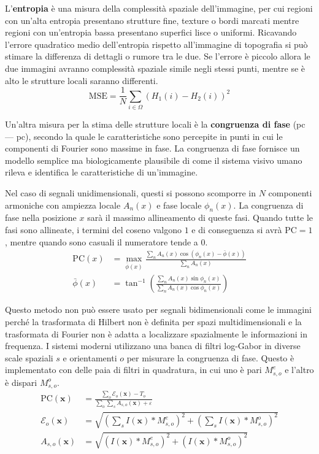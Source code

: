 \documentclass[../main.tex]{subfiles}
\begin{document}
L'\textbf{entropia} è una misura della complessità spaziale dell'immagine, per cui regioni con un'alta entropia presentano strutture fine, texture o bordi marcati mentre regioni con un'entropia bassa presentano superfici lisce o uniformi. Ricavando l'errore quadratico medio dell'entropia rispetto all'immagine di topografia si può stimare la differenza di dettagli o rumore tra le due. Se l'errore è piccolo allora le due immagini avranno complessità spaziale simile negli stessi punti, mentre se è alto le strutture locali saranno differenti.
\begin{equation}
	\text{MSE} = \frac{1}{N}\sum_{i\in\Omega}\left(H_1(i)-H_2(i)\right)^2
\end{equation}

Un'altra misura per la stima delle strutture locali è la \textbf{congruenza di fase} (\acrlong{pc} --- \acrshort{pc}), secondo la quale le caratteristiche sono percepite in punti in cui le componenti di Fourier sono massime in fase. La congruenza di fase fornisce un modello semplice ma biologicamente plausibile di come il sistema visivo umano rileva e identifica le caratteristiche di un'immagine.\cite{kovesi_1999,morrone_1988}

Nel caso di segnali unidimensionali, questi si possono scomporre in $N$ componenti armoniche con ampiezza locale $A_n(x)$ e fase locale $\phi_n(x)$. La congruenza di fase nella posizione $x$ sarà il massimo allineamento di queste fasi. Quando tutte le fasi sono allineate, i termini del coseno valgono $1$ e di conseguenza si avrà $\text{PC} = 1$, mentre quando sono casuali il numeratore tende a $0$.
\begin{align}
	\text{PC}(x) &= \underset{\bar{\phi}(x)}{\max}\frac{\sum_n A_n(x) \cos\left(\phi_n(x) - \bar{\phi}(x)\right)}{\sum_n A_n(x)}\\[10pt]
	\bar{\phi}(x) &= \tan^{-1}\left(\frac{\sum_n A_n(x)\sin\phi_n(x)}{\sum_n A_n(x)\cos\phi_n(x)}\right)
\end{align}

Questo metodo non può essere usato per segnali bidimensionali come le immagini perché la trasformata di Hilbert non è definita per spazi multidimensionali e la trasformata di Fourier non è adatta a localizzare spazialmente le informazioni in frequenza. I sistemi moderni utilizzano una banca di filtri log-Gabor in diverse scale spaziali $s$ e orientamenti $o$ per misurare la congruenza di fase. Questo è implementato con delle paia di filtri in quadratura, in cui uno è pari $M^e_{s,o}$ e l'altro è dispari $M^o_{s,o}$.\cite{kovesi_2003}
\begin{align}
	\text{PC}(\mathbf{x}) &= \frac{\sum_o \mathcal{E}_o(\mathbf{x}) - T_o}{\sum_o\sum_s A_{s,o}(\mathbf{x})+\varepsilon}\\[6pt]
	\mathcal{E}_o(\mathbf{x}) &= \sqrt{\left(\sum_s I(\mathbf{x}) * M^e_{s,o}\right)^2 + \left(\sum_s I(\mathbf{x}) * M^o_{s,o}\right)^2}\\[6pt]
	A_{s,o}(\mathbf{x}) &= \sqrt{\left(I(\mathbf{x}) * M^e_{s,o}\right)^2 + \left(I(\mathbf{x}) * M^o_{s,o}\right)^2}
\end{align}
\end{document}
